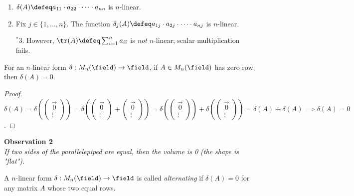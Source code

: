 \begin{example}
    \begin{enumerate}
        \item $\delta(A) \defeq a_{11}\cdot a_{22}\cdot \dots \cdot a_{nn}$ is $n$-linear.
        \item Fix $j \in \{1, \dots, n\}$. The function $\delta_j(A) \defeq a_{1j}\cdot a_{2j} \cdot \dots \cdot a_{nj}$ is $n$-linear.
        \item[$^\ast 3.$] However, $\tr(A) \defeq \sum_{i=1}^n a_{ii}$ is \emph{not} $n$-linear; scalar multiplication fails.
    \end{enumerate}
\end{example}

\begin{proposition}
    For an $n$-linear form $\delta : M_n(\field) \to \field$, if $A \in M_n(\field)$ has zero row, then $\delta(A) = 0$.
\end{proposition}

\begin{proof}
    $\delta(A) = \delta\left( \begin{pmatrix}
        \vec{0}\\
        \vdots
    \end{pmatrix}\right) = \delta\left(\begin{pmatrix}
        \vec{0}\\
        \vdots
    \end{pmatrix}+\begin{pmatrix}
        \vec{0}\\
        \vdots
    \end{pmatrix}\right) = \delta\left(\begin{pmatrix}
        \vec{0}\\
        \vdots
    \end{pmatrix}\right) + \delta\left(\begin{pmatrix}
        \vec{0}\\
        \vdots
    \end{pmatrix}\right) = \delta(A) + \delta (A) \implies \delta(A) = 0$.
\end{proof}


\begin{center}
    \textbf{Observation 2}\\
    \textit{If two sides of the parallelepiped are equal, then the volume is 0 (the shape is "flat").}
\end{center}

\begin{definition}[Alternating]
    A $n$-linear form $\delta : M_n(\field) \to \field$ is called \emph{alternating} if $\delta(A) = 0$ for any matrix $A$ whose two equal rows.
\end{definition}

